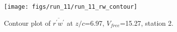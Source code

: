\begin{figure}[H]
\centering
\texttt{[image: figs/run\_11/run\_11\_rw\_contour]}
\caption{Contour plot of $\overline{r^\prime w^\prime}$ at $z/c$=6.97, $V_{free}$=15.27, station 2.}
\label{fig:run_11_rw_contour}
\end{figure}


